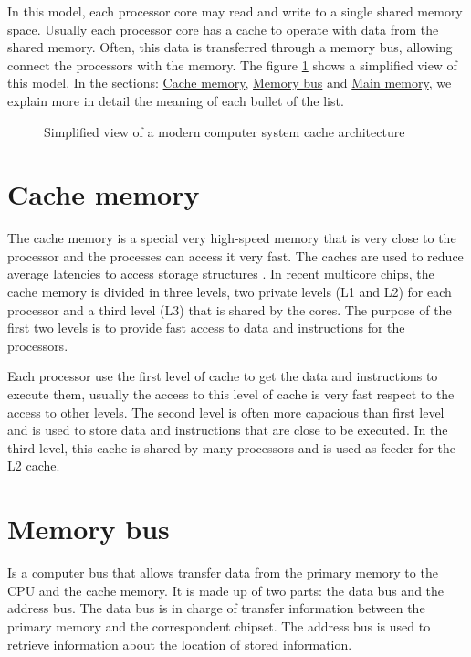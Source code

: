 \documentclass[openany, a4paper]{book}
\theoremstyle{break}
\theoremstyle{example}
\theoremstyle{note}
\theoremstyle{break}
\theoremstyle{exercise}
\begin{document}
In this model, each processor core may read and
write to a single shared memory space. Usually each processor core has a
cache to operate with data from the shared memory. Often, this data is
transferred through a memory bus, allowing connect the processors with the
memory. The figure \ref{fig:arch} shows a simplified view of this model. In
the sections: \hyperref[sec:org369583b]{Cache memory}, \hyperref[sec:org0325829]{Memory bus} and \hyperref[sec:orgd7c9667]{Main memory}, we explain more in
detail the meaning of each bullet of the list.

\begin{figure}
\begin{minipage}{\linewidth}
  
\end{minipage}
\caption{Simplified view of a modern computer system cache architecture}
\label{fig:arch}
\end{figure}

\section{Cache memory}
\label{sec:org369583b}

The cache memory is a special very high-speed memory that is very close to
the processor and the processes can access it very fast. The caches are used
to reduce average latencies to access storage structures
\cite{DBLP_series_synthesis_2020Nagarajan}. In recent multicore chips, the
cache memory is divided in three levels, two private levels (L1 and L2) for
each processor and a third level (L3) that is shared by the cores. The
purpose of the first two levels is to provide fast access to data and
instructions for the processors.

Each processor use the first level of cache to get the data and instructions
to execute them, usually the access to this level of cache is very fast
respect to the access to other levels.  The second level is often more
capacious than first level and is used to store data and instructions that
are close to be executed. In the third level, this cache is shared by many
processors and is used as feeder for the L2 cache.


\section{Memory bus}
\label{sec:org0325829}

Is a computer bus that allows transfer data from the primary memory to the
CPU and the cache memory. It is made up of two parts: the data bus and the
address bus. The data bus is in charge of transfer information between the
primary memory and the correspondent chipset.
The address bus is used to retrieve information about the location of stored
information.
\end{document}
